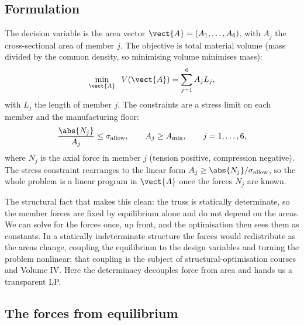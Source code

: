 

\subsection{Formulation}

The decision variable is the area vector $\vect{A} = (A_{1},
\ldots, A_{6})$, with $A_{j}$ the cross-sectional area of member
$j$. The objective is total material volume (mass divided by the
common density, so minimising volume minimises mass):
\[
\min_{\vect{A}} \;\; V(\vect{A}) = \sum_{j=1}^{6} A_{j} L_{j},
\]
with $L_{j}$ the length of member $j$. The constraints are a stress
limit on each member and the manufacturing floor:
\[
\frac{\abs{N_{j}}}{A_{j}} \leq \sigma_{\mathrm{allow}}, \qquad
A_{j} \geq A_{\min}, \qquad j = 1, \ldots, 6,
\]
where $N_{j}$ is the axial force in member $j$ (tension positive,
compression negative). The stress constraint rearranges to the
linear form $A_{j} \geq \abs{N_{j}} / \sigma_{\mathrm{allow}}$, so
the whole problem is a linear program in $\vect{A}$ once the forces
$N_{j}$ are known.

The structural fact that makes this clean: the truss is statically
determinate, so the member forces are fixed by equilibrium alone
and do not depend on the areas. We can solve for the forces once,
up front, and the optimisation then sees them as constants. In a
statically indeterminate structure the forces would redistribute as
the areas change, coupling the equilibrium to the design variables
and turning the problem nonlinear; that coupling is the subject of
structural-optimisation courses and Volume IV. Here the
determinacy decouples force from area and hands us a transparent
LP.

\subsection{The forces from equilibrium}

